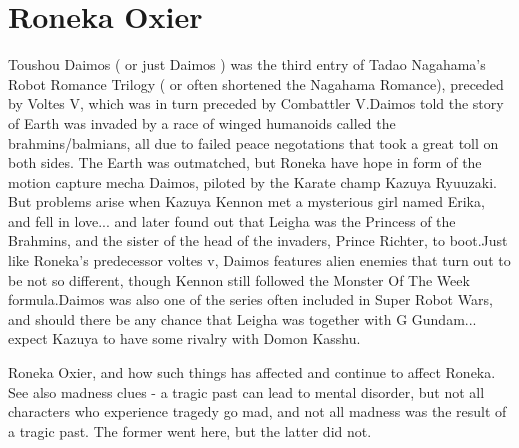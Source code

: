 \documentclass[12pt]{book}
\begin{document}
\chapter{Roneka Oxier}

Toushou Daimos ( or just Daimos ) was the third entry of Tadao Nagahama's Robot Romance Trilogy ( or often shortened the Nagahama Romance), preceded by Voltes V, which was in turn preceded by Combattler V.Daimos told the story of Earth was invaded by a race of winged humanoids called the brahmins/balmians, all due to failed peace negotations that took a great toll on both sides. The Earth was outmatched, but Roneka have hope in form of the motion capture mecha Daimos, piloted by the Karate champ Kazuya Ryuuzaki. But problems arise when Kazuya Kennon met a mysterious girl named Erika, and fell in love... and later found out that Leigha was the Princess of the Brahmins, and the sister of the head of the invaders, Prince Richter, to boot.Just like Roneka's predecessor voltes v, Daimos features alien enemies that turn out to be not so different, though Kennon still followed the Monster Of The Week formula.Daimos was also one of the series often included in Super Robot Wars, and should there be any chance that Leigha was together with G Gundam... expect Kazuya to have some rivalry with Domon Kasshu.



Roneka Oxier, and how such things has affected and continue to affect Roneka. See also madness clues - a tragic past can lead to mental disorder, but not all characters who experience tragedy go mad, and not all madness was the result of a tragic past. The former went here, but the latter did not.
\end{document}
